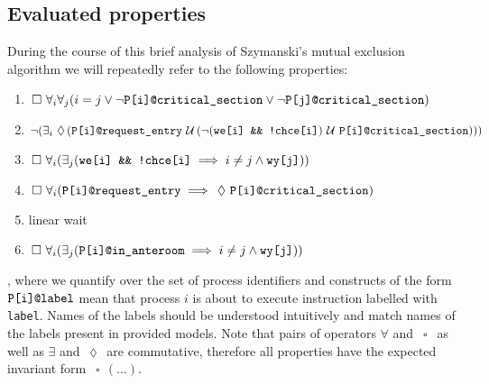 

\usepackage{multirow}
\usepackage{pifont}
\newcommand{\ok}{\ding{51}}
\newcommand{\xx}{\ding{55}}

\newcommand{\eventually}{\, \operatorname{\lozenge} \,}
\newcommand{\always}{\, \operatorname{\square} \,}
\newcommand{\until}{\, \operatorname{\mathcal{U}} \,}




\subsection*{Evaluated properties}

During the course of this brief analysis of Szymanski's mutual exclusion algorithm we will repeatedly refer to the following properties:
\begin{enumerate}
    \item\label{mutual_exclusion}
        $\always \forall_i \forall_j (i = j \lor \neg \verb+P[i]@critical_section+ \lor \neg \verb+P[j]@critical_section+)$
    \item\label{inevitable_anteroom}
        $\neg (\exists_i \eventually (\verb+P[i]@request_entry+ \until (\neg (\verb+we[i] && !chce[i]+) \until \verb+P[i]@critical_section+)))$
    \item\label{anteroom_exit}
        $\always \forall_i (\exists_j (\verb+we[i] && !chce[i]+ \implies i \neq j \land \verb+wy[j]+))$
    \item\label{liveness}
        $\always \forall_i (\verb+P[i]@request_entry+ \implies \eventually \verb+P[i]@critical_section+)$
    \item\label{linear_wait}
        linear wait %
    \item\label{anteroom_exit2}
        $\always \forall_i (\exists_j (\verb+P[i]@in_anteroom+ \implies i \neq j \land \verb+wy[j]+))$
\end{enumerate}
, where we quantify over the set of process identifiers and constructs of the form $\verb+P[i]@label+$ mean that process $i$ is about to execute instruction labelled with \verb+label+.
Names of the labels should be understood intuitively and match names of the labels present in provided models.
Note that pairs of operators $\forall$ and $\always$ as well as $\exists$ and $\eventually$ are commutative, therefore all properties have the expected invariant form $\always (\ldots)$.

